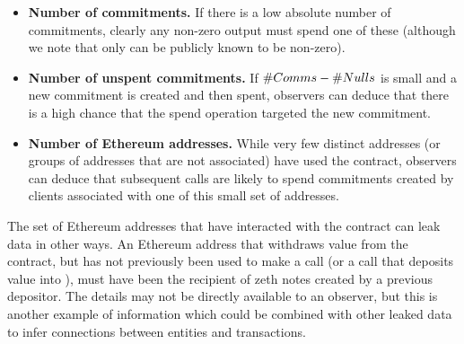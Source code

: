 \begin{itemize}
\item \textbf{Number of commitments.} If there is a low absolute number of commitments, clearly any non-zero output must spend one of these (although we note that only \vout{} can be publicly known to be non-zero).
\item \textbf{Number of unspent commitments.} If $\#{Comms} - \#{Nulls}$ is small and a new commitment is created and then spent, observers can deduce that there is a high chance that the spend operation targeted the new commitment.
\item \textbf{Number of Ethereum addresses.} While very few distinct addresses (or groups of addresses that are not associated) have used the contract, observers can deduce that subsequent \mix{} calls are likely to spend commitments created by clients associated with one of this small set of addresses.
\end{itemize}

The set of Ethereum addresses that have interacted with the contract can leak data in other ways. An Ethereum address that withdraws value from the contract, but has not previously been used to make a \mix{} call (or a \mix{} call that deposits value into \mixer), must have been the recipient of zeth notes created by a previous depositor. The details may not be directly available to an observer, but this is another example of information which could be combined with other leaked data to infer connections between entities and transactions.
